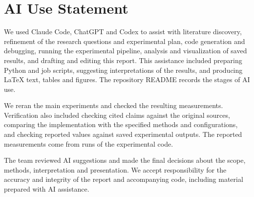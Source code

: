 \section*{AI Use Statement}
We used Claude Code, ChatGPT and Codex to assist with literature discovery, refinement of the research questions and experimental plan, code generation and debugging, running the experimental pipeline, analysis and visualization of saved results, and drafting and editing this report. This assistance included preparing Python and job scripts, suggesting interpretations of the results, and producing LaTeX text, tables and figures. The repository README records the stages of AI use.

We reran the main experiments and checked the resulting measurements. Verification also included checking cited claims against the original sources, comparing the implementation with the specified methods and configurations, and checking reported values against saved experimental outputs. The reported measurements come from runs of the experimental code.

The team reviewed AI suggestions and made the final decisions about the scope, methods, interpretation and presentation. We accept responsibility for the accuracy and integrity of the report and accompanying code, including material prepared with AI assistance.
